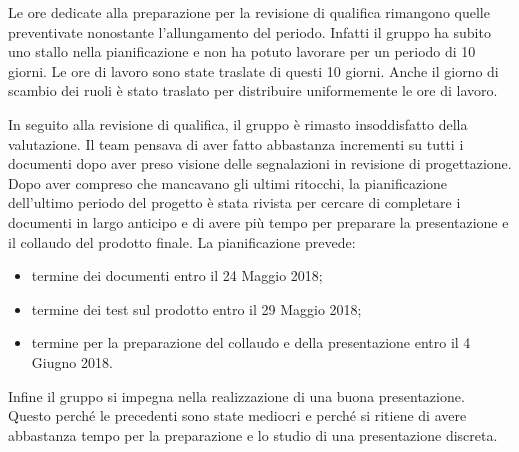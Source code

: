Le ore dedicate alla preparazione per la revisione di qualifica rimangono quelle preventivate nonostante l'allungamento del periodo. Infatti il gruppo ha subito uno stallo nella pianificazione e non ha potuto lavorare per un periodo di 10 giorni. Le ore di lavoro sono state traslate di questi 10 giorni. Anche il giorno di scambio dei ruoli è stato traslato per distribuire uniformemente le ore di lavoro.\\

 \label{inSeguitoRQ}

In seguito alla revisione di qualifica, il gruppo è rimasto insoddisfatto della valutazione. Il team pensava di aver fatto abbastanza incrementi su tutti i documenti dopo aver preso visione delle segnalazioni in revisione di progettazione. Dopo aver compreso che mancavano gli ultimi ritocchi, la pianificazione dell'ultimo periodo del progetto è stata rivista per cercare di completare i documenti in largo anticipo e di avere più tempo per preparare la presentazione e il collaudo del prodotto finale. La pianificazione prevede:
\begin{itemize}
	\item termine dei documenti entro il 24 Maggio 2018;
	\item termine dei test sul prodotto entro il 29 Maggio 2018;
	\item termine per la preparazione del collaudo e della presentazione entro il 4 Giugno 2018.
\end{itemize}

Infine il gruppo si impegna nella realizzazione di una buona presentazione. Questo perché le precedenti sono state mediocri e perché si ritiene di avere abbastanza tempo per la preparazione e lo studio di una presentazione discreta.


